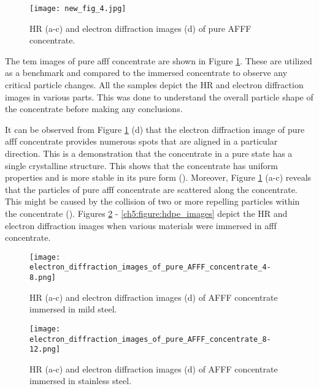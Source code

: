 \begin{figure}[H]
\centering
\texttt{[image: new\_fig\_4.jpg]}

\caption{HR (a-c) and electron diffraction images (d) of pure AFFF concentrate.}
\label{ch5:figure:pure_afff_images}
\end{figure}

The \acrshort{tem} images of pure \acrshort{afff} concentrate are shown in Figure \ref{ch5:figure:pure_afff_images}. These are utilized as a benchmark and compared to the immersed concentrate to observe any critical particle changes. All the samples depict the HR and electron diffraction images in various parts. This was done to understand the overall particle shape of the concentrate before making any conclusions.

It can be observed from Figure \ref{ch5:figure:pure_afff_images} (d) that the electron diffraction image of pure \acrshort{afff} concentrate provides numerous spots that are aligned in a particular direction. This is a demonstration that the concentrate in a pure state has a single crystalline structure. This shows that the concentrate has uniform properties and is more stable in its pure form (\cite{bandyopadhyay2019fabrication}). Moreover, Figure \ref{ch5:figure:pure_afff_images} (a-c) reveals that the particles of pure \acrshort{afff} concentrate are scattered along the concentrate. This might be caused by the collision of two or more repelling particles within the concentrate (\cite{pyrz2008particle}). Figures \ref{ch5:figure:mild_steel_images} - \ref{ch5:figure:hdpe_images} depict the HR and electron diffraction images when various materials were immersed in \acrshort{afff} concentrate. 
  
\begin{figure}[H]
\centering

\texttt{[image: electron\_diffraction\_images\_of\_pure\_AFFF\_concentrate\_4-8.png]}

\caption{HR (a-c) and electron diffraction images (d) of AFFF concentrate immersed in mild steel.}
\label{ch5:figure:mild_steel_images}
\end{figure}

\begin{figure}[H]
\centering

\texttt{[image: electron\_diffraction\_images\_of\_pure\_AFFF\_concentrate\_8-12.png]}

\caption{HR (a-c) and electron diffraction images (d) of AFFF concentrate immersed in stainless steel.}
\label{ch5:figure:stainless_steel_images}
\end{figure}

